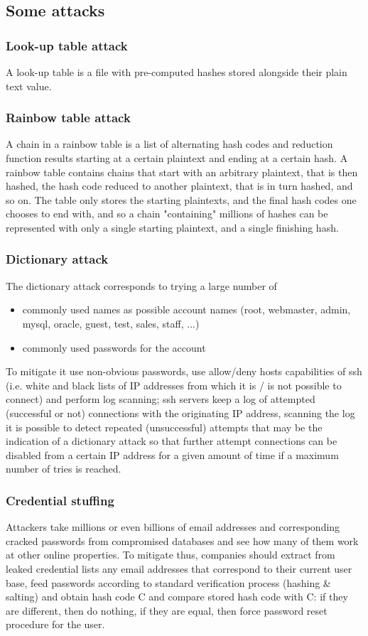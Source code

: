 \documentclass[a4paper, 10pt, titlepage]{article}
\begin{document}
\subsection{Some attacks}
\subsubsection{Look-up table attack}
A look-up table is a file with pre-computed hashes stored alongside their plain text value.

\subsubsection{Rainbow table attack}
A chain in a rainbow table is a list of alternating hash codes and reduction function results starting at a certain plaintext and ending at a certain hash. A rainbow table contains chains that start with an arbitrary plaintext, that is then hashed, the hash code reduced to another plaintext, that is in turn hashed, and so on. The table only stores the starting plaintexts, and the final hash codes one chooses to end with, and so a chain "containing" millions of hashes can be represented with only a single starting plaintext, and a single finishing hash.

\subsubsection{Dictionary attack}
The dictionary attack corresponds to trying a large number of
\begin{itemize}
\item commonly used names as possible account names (root, webmaster, admin, mysql, oracle, guest, test, sales, staff, ...)
\item commonly used passwords for the account
\end{itemize}
To mitigate it use non-obvious passwords, use allow/deny hosts capabilities of ssh (i.e. white and black lists of IP addresses from which it is / is not possible to connect) and perform log scanning; ssh servers keep a log of attempted (successful or not) connections with the originating IP address, scanning the log it is possible to detect repeated (unsuccessful) attempts that may be the indication of a dictionary attack so that further attempt connections can be disabled from a certain IP address for a given amount of time if a maximum number of tries is reached.

\subsubsection{Credential stuffing}
Attackers take millions or even billions of email addresses and corresponding cracked passwords from compromised databases and see how many of them work at other online properties. To mitigate thus, companies should extract from leaked credential lists any email addresses that correspond to their current user base, feed passwords according to standard verification process (hashing \& salting) and obtain hash code C and compare stored hash code with C: if they are different, then do nothing, if they are equal, then force password reset procedure for the user.
\end{document}
